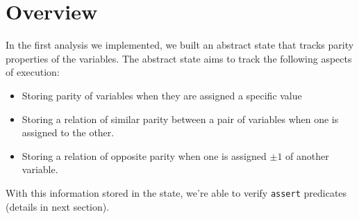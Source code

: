\section*{Overview}
In the first analysis we implemented, we built an abstract state that tracks parity properties of the variables. The abstract state aims to track the following aspects of execution:
\begin{itemize}
	\item Storing parity of variables when they are assigned a specific value
	\item Storing a relation of similar parity between a pair of variables when one is assigned to the other.
	\item Storing a relation of opposite parity when one is assigned $\pm1$ of another variable.
\end{itemize}

With this information stored in the state, we're able to verify \texttt{assert} predicates (details in next section).